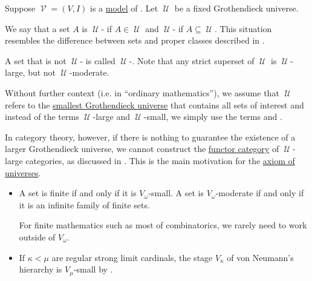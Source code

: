 \begin{definition}\label{def:large_and_small_sets}
  Suppose \( \mscrV = (V, I) \) is a \hyperref[def:first_order_model]{model} of . Let \( \mscrU \) be a fixed Grothendieck universe.

  We say that a set \( A \) is \( \mscrU \)- if \( A \in \mscrU \) and \( \mscrU \)- if \( A \subseteq \mscrU \). This situation resembles the difference between sets and proper classes described in .

  A set that is not \( \mscrU \)- is called \( \mscrU \)-. Note that any strict superset of \( \mscrU \) is \( \mscrU \)-large, but not \( \mscrU \)-moderate.

  Without further context (i.e. in \enquote{ordinary mathematics}), we assume that \( \mscrU \) refers to the \hyperref[thm:smallest_grothendieck_universe_existence]{smallest Grothendieck universe} that contains all sets of interest and instead of the terms \( \mscrU \)-large and \( \mscrU \)-small, we simply use the terms  and .

  In category theory, however, if there is nothing to guarantee the existence of a larger Grothendieck universe, we cannot construct the \hyperref[def:functor_category]{functor category} of \( \mscrU \)-large categories, as discussed in . This is the main motivation for the \hyperref[def:axiom_of_universes]{axiom of universes}.
\end{definition}

\begin{example}\label{ex:large_and_small_sets}
  \hfill
  \begin{itemize}
    \item A set is finite if and only if it is \( V_\omega \)-small. A set is \( V_\omega \)-moderate if and only if it is an infinite family of finite sets.

    For finite mathematics such as most of combinatorics, we rarely need to work outside of \( V_\omega \).

    \item If \( \kappa < \mu \) are regular strong limit cardinals, the stage \( V_\kappa \) of von Neumann's hierarchy is \( V_\mu \)-small by .
  \end{itemize}
\end{example}

